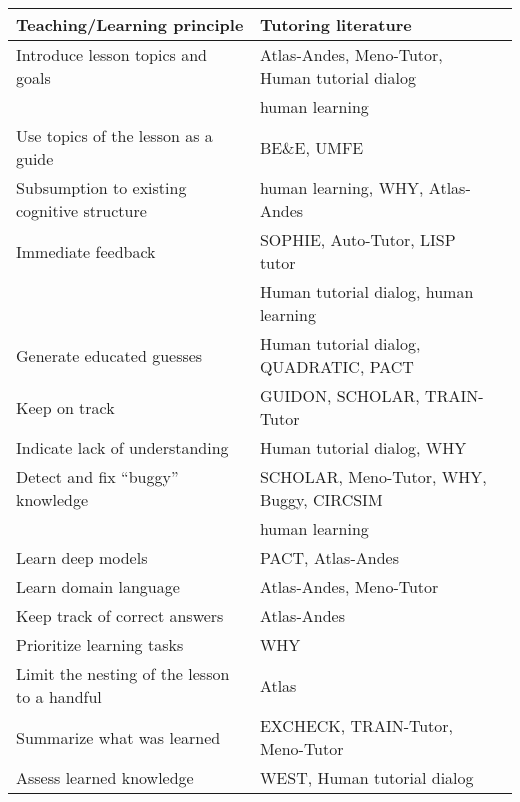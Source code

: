 \documentclass{llncs}
\begin{document}
\begin{table}
\begin{center}
\vspace*{-0.7em}
\begin{scriptsize}

\begin{tabular}{|l||l |l |} \hline
Teaching/Learning principle & Tutoring literature \\

\hline \hline
Introduce lesson topics and goals & Atlas-Andes, Meno-Tutor, Human tutorial
dialog \\
 & human learning \\
\hline
Use topics of the lesson as a guide & BE\&E, UMFE   \\
\hline 
Subsumption to existing cognitive structure & human learning, WHY, Atlas-Andes \\
\hline
	
Immediate feedback & SOPHIE, Auto-Tutor, LISP tutor  \\
 &  Human tutorial dialog, human learning  \\
\hline

Generate educated guesses & Human tutorial dialog, QUADRATIC, PACT \\
\hline 
Keep on track & GUIDON, SCHOLAR, TRAIN-Tutor \\
\hline 

Indicate lack of understanding & Human tutorial dialog, WHY  \\
\hline
Detect and fix ``buggy'' knowledge & SCHOLAR, Meno-Tutor, WHY, Buggy, CIRCSIM \\
 & human learning\\
\hline


Learn deep models & PACT, Atlas-Andes  \\
\hline
Learn domain language & Atlas-Andes, Meno-Tutor  \\
\hline

Keep track of correct answers & Atlas-Andes  \\
\hline
Prioritize learning tasks & WHY \\
\hline

Limit the nesting of the lesson to a handful & Atlas  \\
\hline

Summarize what was learned & EXCHECK, TRAIN-Tutor, Meno-Tutor  \\
\hline
Assess learned knowledge & WEST, Human tutorial dialog \\
\hline


\end{tabular}
\end{scriptsize}
\end{center}
\end{table}
\end{document}
